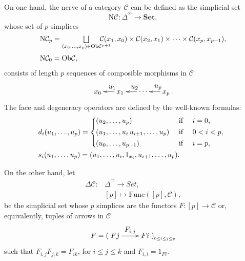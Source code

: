 \documentclass[]{amsart}
\begin{document}
On one hand, the nerve of a category ${\ensuremath{\mathcal{C}}}$ can be defined as the simplicial set
\begin{equation}\label{p.1.1}
{\ensuremath{\mathrm{N}}}{\ensuremath{\mathcal{C}}} :\Delta^{\!{^\mathrm{op}}}\longrightarrow  {\ensuremath{\mathbf{Set}}}, \end{equation} whose set of $p$-simplices
$$\begin{array}{l} {\ensuremath{\mathrm{N}}}{\ensuremath{\mathcal{C}}}_p = \bigsqcup\limits _{(x_0,\ldots,x_p)\in \mbox{\scriptsize
Ob}{\ensuremath{\mathcal{C}}}^{p+1}}\hspace{-0.6cm}
{\ensuremath{\mathcal{C}}}(x_1,x_0)\times{\ensuremath{\mathcal{C}}}(x_2,x_1)\times\cdots\times{\ensuremath{\mathcal{C}}}(x_p,x_{p-1}),\\[15pt] {\ensuremath{\mathrm{N}}}{\ensuremath{\mathcal{C}}}_0=\mbox{Ob}{\ensuremath{\mathcal{C}}},\end{array}$$ consists of  length $p$ sequences of composible morphisms in ${\ensuremath{\mathcal{C}}}$
$$\xymatrix@C=15pt{x_0&\ar[l]_<<{\textstyle u_1}x_1&\ar[l]_<<{\textstyle u_2}\cdots&\ar[l]_<<{\textstyle u_p}x_p}.
$$
The face and degeneracy operators are defined by the well-known formulas:
\begin{equation}\label{p.1.2}\begin{array}{l} d_i(u_1,\dots,u_p)=\left\{
\begin{array}{lcl}
\hspace{-0.2cm}  (u_2,\dots,u_p) &\text{ if }& i=0 ,  \\[4pt]
\hspace{-0.2cm}  (u_1,\dots,u_i\,u_{i\text{+}1},\dots,u_p) & \text{ if } & 0<i<p , \\[4pt]
\hspace{-0.2cm}  (u_0,\dots,u_{p-1}) & \text{ if }& i=p,
\end{array}\right.\\[20pt]
s_i(u_1,\dots,u_p)=(u_1,\dots,u_i,1_{x_i},u_{i\text{+}1},\dots, u_p).
\end{array}
\end{equation}

On the other hand, let
\begin{equation}\label{p.1.3} \begin{array}{ll}\Delta{\ensuremath{\mathcal{C}}}:&\Delta^{\!{^\mathrm{op}}}\longrightarrow Set,\\[6pt] &[p]\mapsto {\ensuremath{\mathrm{Func}}}([p],{\ensuremath{\mathcal{C}}}),\end{array} \end{equation} be the simplicial set whose $p$ simplices are the functors $F:[p]\to {\mathcal C}$ or, equivalently, tuples of
arrows in ${\ensuremath{\mathcal{C}}}$ $$F=(\xymatrix{Fj\ar[r]^{\textstyle F_{i,j}}& Fi})_{_{0\leq i\leq j\leq p}}$$ such
that $F_{i,j}F_{j,k}=F_{ik}$, for $i\leq j\leq k$ and $F_{i,i}=1_{Fi}$.
\end{document}
